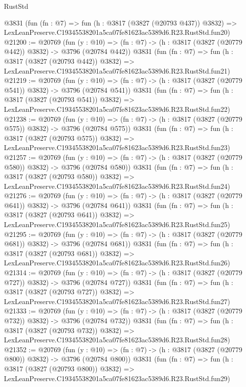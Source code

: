 \begin{lexlean}{RustStd}
\begin{coremodule}
    @3831
    (fun (fn : @7) =>
    fun (h : @3817 (@3827 (@20793 @437)) @3832) =>
    LexLeanPreserve.C19345538201a5ca07fe81623ac5389d6.R23.RustStd.fun20)
@21200 := @20769
    (fun (y : @10) => (fn : @7) -> (h : @3817 (@3827 (@20779 @442)) @3832) -> @3796 (@20784 @442))
    @3831
    (fun (fn : @7) =>
    fun (h : @3817 (@3827 (@20793 @442)) @3832) =>
    LexLeanPreserve.C19345538201a5ca07fe81623ac5389d6.R23.RustStd.fun21)
@21219 := @20769
    (fun (y : @10) => (fn : @7) -> (h : @3817 (@3827 (@20779 @541)) @3832) -> @3796 (@20784 @541))
    @3831
    (fun (fn : @7) =>
    fun (h : @3817 (@3827 (@20793 @541)) @3832) =>
    LexLeanPreserve.C19345538201a5ca07fe81623ac5389d6.R23.RustStd.fun22)
@21238 := @20769
    (fun (y : @10) => (fn : @7) -> (h : @3817 (@3827 (@20779 @575)) @3832) -> @3796 (@20784 @575))
    @3831
    (fun (fn : @7) =>
    fun (h : @3817 (@3827 (@20793 @575)) @3832) =>
    LexLeanPreserve.C19345538201a5ca07fe81623ac5389d6.R23.RustStd.fun23)
@21257 := @20769
    (fun (y : @10) => (fn : @7) -> (h : @3817 (@3827 (@20779 @580)) @3832) -> @3796 (@20784 @580))
    @3831
    (fun (fn : @7) =>
    fun (h : @3817 (@3827 (@20793 @580)) @3832) =>
    LexLeanPreserve.C19345538201a5ca07fe81623ac5389d6.R23.RustStd.fun24)
@21276 := @20769
    (fun (y : @10) => (fn : @7) -> (h : @3817 (@3827 (@20779 @641)) @3832) -> @3796 (@20784 @641))
    @3831
    (fun (fn : @7) =>
    fun (h : @3817 (@3827 (@20793 @641)) @3832) =>
    LexLeanPreserve.C19345538201a5ca07fe81623ac5389d6.R23.RustStd.fun25)
@21295 := @20769
    (fun (y : @10) => (fn : @7) -> (h : @3817 (@3827 (@20779 @681)) @3832) -> @3796 (@20784 @681))
    @3831
    (fun (fn : @7) =>
    fun (h : @3817 (@3827 (@20793 @681)) @3832) =>
    LexLeanPreserve.C19345538201a5ca07fe81623ac5389d6.R23.RustStd.fun26)
@21314 := @20769
    (fun (y : @10) => (fn : @7) -> (h : @3817 (@3827 (@20779 @727)) @3832) -> @3796 (@20784 @727))
    @3831
    (fun (fn : @7) =>
    fun (h : @3817 (@3827 (@20793 @727)) @3832) =>
    LexLeanPreserve.C19345538201a5ca07fe81623ac5389d6.R23.RustStd.fun27)
@21333 := @20769
    (fun (y : @10) => (fn : @7) -> (h : @3817 (@3827 (@20779 @732)) @3832) -> @3796 (@20784 @732))
    @3831
    (fun (fn : @7) =>
    fun (h : @3817 (@3827 (@20793 @732)) @3832) =>
    LexLeanPreserve.C19345538201a5ca07fe81623ac5389d6.R23.RustStd.fun28)
@21352 := @20769
    (fun (y : @10) => (fn : @7) -> (h : @3817 (@3827 (@20779 @800)) @3832) -> @3796 (@20784 @800))
    @3831
    (fun (fn : @7) =>
    fun (h : @3817 (@3827 (@20793 @800)) @3832) =>
    LexLeanPreserve.C19345538201a5ca07fe81623ac5389d6.R23.RustStd.fun29)

\end{coremodule}
\end{lexlean}
